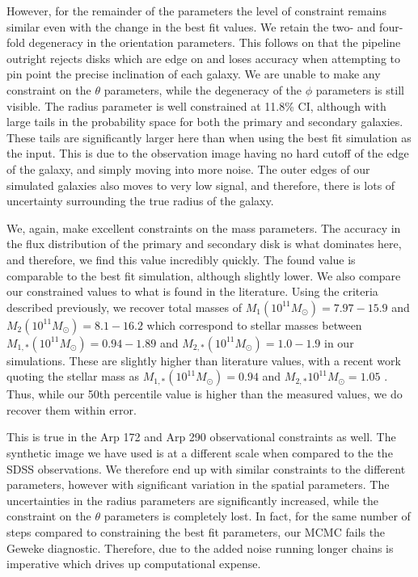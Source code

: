 However, for the remainder of the parameters the level of constraint remains similar even with the change in the best fit values. We retain the two- and four-fold degeneracy in the orientation parameters. This follows on that the pipeline outright rejects disks which are edge on and loses accuracy when attempting to pin point the precise inclination of each galaxy. We are unable to make any constraint on the $\theta$ parameters, while the degeneracy of the $\phi$ parameters is still visible. The radius parameter is well constrained at 11.8\% CI, although with large tails in the probability space for both the primary and secondary galaxies. These tails are significantly larger here than when using the best fit simulation as the input. This is due to the observation image having no hard cutoff of the edge of the galaxy, and simply moving into more noise. The outer edges of our simulated galaxies also moves to very low signal, and therefore, there is lots of uncertainty surrounding the true radius of the galaxy. 

We, again, make excellent constraints on the mass parameters. The accuracy in the flux distribution of the primary and secondary disk is what dominates here, and therefore, we find this value incredibly quickly. The found value is comparable to the best fit simulation, although slightly lower. We also compare our constrained values to what is found in the literature. Using the criteria described previously, we recover total masses of $M_{1} (10^{11}M_{\odot}) = 7.97 - 15.9$ and $M_{2} (10^{11}M_{\odot}) = 8.1 - 16.2$ which correspond to stellar masses between $M_{1,*}(10^{11}M_{\odot}) =  0.94 - 1.89$ and $M_{2, *} (10^{11}M_{\odot}) = 1.0 - 1.9$ in our simulations. These are slightly higher than literature values, with a recent work quoting the stellar mass as $M_{1, *}(10^{11}M_{\odot}) = 0.94 $ and $M_{2, *}10^{11}M_{\odot} = 1.05$ \citep{2020MNRAS.496.5243H}. Thus, while our 50th percentile value is higher than the measured values, we do recover them within error.

This is true in the Arp 172 and Arp 290 observational constraints as well. The synthetic image we have used is at a different scale when compared to the the SDSS observations. We therefore end up with similar constraints to the different parameters, however with significant variation in the spatial parameters. The uncertainties in the radius parameters are significantly increased, while the constraint on the $\theta$ parameters is completely lost. In fact, for the same number of steps compared to constraining the best fit parameters, our MCMC fails the Geweke diagnostic. Therefore, due to the added noise running longer chains is imperative which drives up computational expense.

